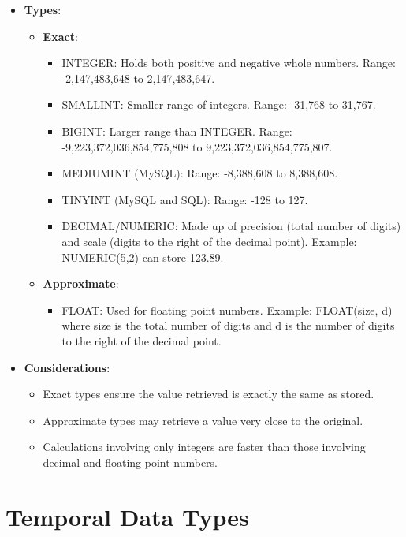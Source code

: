 \documentclass{article}
\begin{document}
\begin{itemize}
    \item \textbf{Types}:
    \begin{itemize}
        \item \textbf{Exact}:
        \begin{itemize}
            \item INTEGER: Holds both positive and negative whole numbers. Range: -2,147,483,648 to 2,147,483,647.
            \item SMALLINT: Smaller range of integers. Range: -31,768 to 31,767.
            \item BIGINT: Larger range than INTEGER. Range: -9,223,372,036,854,775,808 to 9,223,372,036,854,775,807.
            \item MEDIUMINT (MySQL): Range: -8,388,608 to 8,388,608.
            \item TINYINT (MySQL and SQL): Range: -128 to 127.
            \item DECIMAL/NUMERIC: Made up of precision (total number of digits) and scale (digits to the right of the decimal point). Example: NUMERIC(5,2) can store 123.89.
        \end{itemize}
        \item \textbf{Approximate}:
        \begin{itemize}
            \item FLOAT: Used for floating point numbers. Example: FLOAT(size, d) where size is the total number of digits and d is the number of digits to the right of the decimal point.
        \end{itemize}
    \end{itemize}
    \item \textbf{Considerations}:
    \begin{itemize}
        \item Exact types ensure the value retrieved is exactly the same as stored.
        \item Approximate types may retrieve a value very close to the original.
        \item Calculations involving only integers are faster than those involving decimal and floating point numbers.
    \end{itemize}
\end{itemize}
\section{Temporal Data Types}
\end{document}
